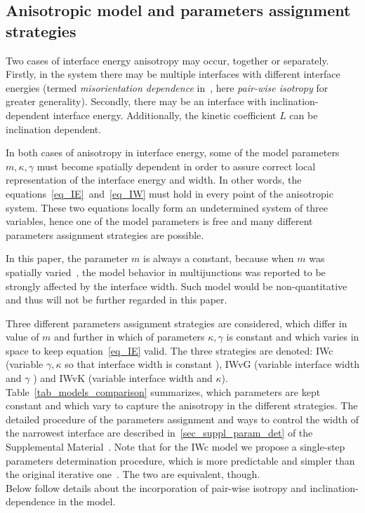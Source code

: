 \subsection{Anisotropic model and parameters assignment strategies}
Two cases of interface energy anisotropy may occur, together or separately. Firstly, in the system there may be multiple interfaces with different interface energies (termed \textit{misorientation dependence} in~\cite{Moelans2008}, here \textit{pair-wise isotropy} for greater generality). Secondly, there may be an interface with inclination-dependent interface energy. Additionally, the kinetic coefficient $L$ can be inclination dependent. 

In both cases of anisotropy in interface energy, some of the model parameters $m,\kappa, \gamma$ must become spatially dependent in order to assure correct local representation of the interface energy and width. In other words, the equations~\eqref{eq_IE}~and~\eqref{eq_IW} must hold in every point of the anisotropic system.
These two equations locally form an undetermined system of three variables, hence one of the model parameters is free and many different parameters assignment strategies are possible.

In this paper, the parameter $m$ is always a constant, because when $m$ was spatially varied~\cite{Moelans2008}, the model behavior in multijunctions was reported to be strongly affected by the interface width. Such model would be non-quantitative and thus will not be further regarded in this paper.

Three different parameters assignment strategies are considered, which differ in value of $m$ and further in which of parameters $\kappa,\gamma$ is constant and which varies in space to keep equation~\eqref{eq_IE} valid. The three strategies are denoted: IWc (variable $\gamma,\kappa$ so that interface width is constant  \cite{Moelans2008}), IWvG (variable interface width and $\gamma$ \cite{Ravash2017}) and IWvK (variable interface width and $\kappa$).   Table~\ref{tab_models_comparison} summarizes, which parameters are kept constant and which vary to capture the anisotropy in the different strategies. The detailed procedure of the parameters assignment and ways to control the width of the narrowest interface are described in~\ref{sec_suppl_param_det} of the Supplemental Material~\cite{Minar2021suppl}. Note that for the IWc model we propose a single-step parameters determination procedure, which is more predictable and simpler than the original iterative one~\cite{Moelans2008}. The two are equivalent, though.\\
Below follow details about the incorporation of pair-wise isotropy and inclination-dependence in the model. 

